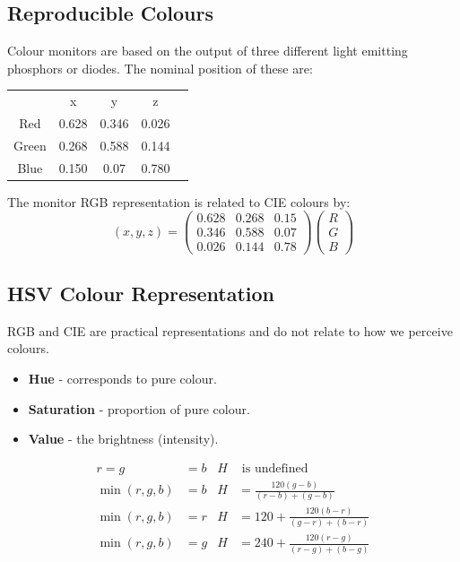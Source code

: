 \documentclass[11pt]{article}
\begin{document}
\subsection{Reproducible Colours}
Colour monitors are based on the output of three different light emitting phosphors or diodes.
The nominal position of these are:
\begin{center}
  \begin{tabular}{c c c c c}
    & x & y & z \\
    Red & 0.628 & 0.346 & 0.026 \\
    Green & 0.268 & 0.588 & 0.144 \\
    Blue & 0.150 & 0.07 & 0.780 
  \end{tabular}
\end{center}

The monitor RGB representation is related to CIE colours by:
\[
  (x, y, z) =
  \begin{pmatrix}
    0.628 & 0.268 & 0.15 \\
    0.346 & 0.588 & 0.07 \\
    0.026 & 0.144 & 0.78
  \end{pmatrix}
  \begin{pmatrix}
    R \\ G \\ B
  \end{pmatrix}
\]

\subsection{HSV Colour Representation}
RGB and CIE are practical representations and do not relate to how we perceive colours.
\begin{itemize}
  \item \textbf{Hue} - corresponds to pure colour.
  \item \textbf{Saturation} - proportion of pure colour.
  \item \textbf{Value} - the brightness (intensity).
\end{itemize}

\begin{align*}
  r = g &= b & H &\text{ is undefined} \\
  \min(r, g, b) &= b & H &= \frac{120(g - b)}{(r - b) + (g - b)} \\
  \min(r, g, b) &= r & H &= 120 + \frac{120(b - r)}{(g - r) + (b - r)} \\
  \min(r, g, b) &= g & H &= 240 + \frac{120(r - g)}{(r - g) + (b - g)}
\end{align*}
\end{document}
